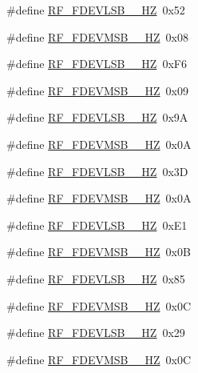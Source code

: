 \begin{DoxyCompactItemize}
\item 
\#define \mbox{\hyperlink{sx1276_regs-_fsk_8h_aa2e0e0c7fe24f55eb301861dcfc3a424}{R\+F\+\_\+\+F\+D\+E\+V\+L\+S\+B\+\_\+\_\+\+HZ}}~0x52
\item 
\#define \mbox{\hyperlink{sx1276_regs-_fsk_8h_a110048d122625ad47fb9d89e148dc5d2}{R\+F\+\_\+\+F\+D\+E\+V\+M\+S\+B\+\_\+\_\+\+HZ}}~0x08
\item 
\#define \mbox{\hyperlink{sx1276_regs-_fsk_8h_a080114dabe30fe534828104407a2722c}{R\+F\+\_\+\+F\+D\+E\+V\+L\+S\+B\+\_\+\_\+\+HZ}}~0x\+F6
\item 
\#define \mbox{\hyperlink{sx1276_regs-_fsk_8h_a7bb4105e24da2db3a56553eb96b85fee}{R\+F\+\_\+\+F\+D\+E\+V\+M\+S\+B\+\_\+\_\+\+HZ}}~0x09
\item 
\#define \mbox{\hyperlink{sx1276_regs-_fsk_8h_a71f7698b87a725be1779b76b935e6a6f}{R\+F\+\_\+\+F\+D\+E\+V\+L\+S\+B\+\_\+\_\+\+HZ}}~0x9A
\item 
\#define \mbox{\hyperlink{sx1276_regs-_fsk_8h_a968b4f3ec96d855980589e665504ed37}{R\+F\+\_\+\+F\+D\+E\+V\+M\+S\+B\+\_\+\_\+\+HZ}}~0x0A
\item 
\#define \mbox{\hyperlink{sx1276_regs-_fsk_8h_a39866c54593a2235f4420210b5b80603}{R\+F\+\_\+\+F\+D\+E\+V\+L\+S\+B\+\_\+\_\+\+HZ}}~0x3D
\item 
\#define \mbox{\hyperlink{sx1276_regs-_fsk_8h_a6b284d8f5090feebc648fdd533537e3c}{R\+F\+\_\+\+F\+D\+E\+V\+M\+S\+B\+\_\+\_\+\+HZ}}~0x0A
\item 
\#define \mbox{\hyperlink{sx1276_regs-_fsk_8h_a22d756238beb3bcd0a2a529f14a39ad5}{R\+F\+\_\+\+F\+D\+E\+V\+L\+S\+B\+\_\+\_\+\+HZ}}~0x\+E1
\item 
\#define \mbox{\hyperlink{sx1276_regs-_fsk_8h_a46b03842ce006837e2c6c45b445491d8}{R\+F\+\_\+\+F\+D\+E\+V\+M\+S\+B\+\_\+\_\+\+HZ}}~0x0B
\item 
\#define \mbox{\hyperlink{sx1276_regs-_fsk_8h_a1be73f0e78b52c082eeeaffe963f599a}{R\+F\+\_\+\+F\+D\+E\+V\+L\+S\+B\+\_\+\_\+\+HZ}}~0x85
\item 
\#define \mbox{\hyperlink{sx1276_regs-_fsk_8h_a630069f35932526b025935cdd3450410}{R\+F\+\_\+\+F\+D\+E\+V\+M\+S\+B\+\_\+\_\+\+HZ}}~0x0C
\item 
\#define \mbox{\hyperlink{sx1276_regs-_fsk_8h_a0053271b65e629e9cdaa5c3f345158d3}{R\+F\+\_\+\+F\+D\+E\+V\+L\+S\+B\+\_\+\_\+\+HZ}}~0x29
\item 
\#define \mbox{\hyperlink{sx1276_regs-_fsk_8h_ab1dad7f0e5a571acc531e431108a9fc9}{R\+F\+\_\+\+F\+D\+E\+V\+M\+S\+B\+\_\+\_\+\+HZ}}~0x0C

\end{DoxyCompactItemize}
